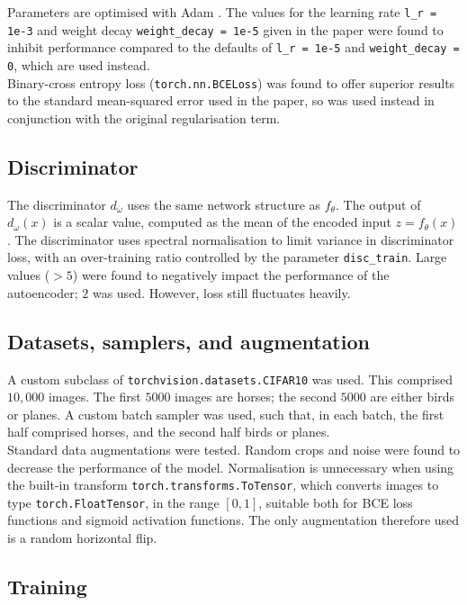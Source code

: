 \documentclass[11pt]{article} %
\begin{document}
Parameters are optimised with Adam \cite{kingma_welling_2014}. The values for the learning rate \verb|l_r = 1e-3| and weight decay \verb|weight_decay = 1e-5| given in the paper were found to inhibit performance compared to the defaults of \verb|l_r = 1e-5| and \verb|weight_decay = 0|, which are used instead.\\

Binary-cross entropy loss (\verb|torch.nn.BCELoss|) was found to offer superior results to the standard mean-squared error used in the paper, so was used instead in conjunction with the original regularisation term.

\subsection{Discriminator}

The discriminator $d_\omega$ uses the same network structure as $f_\theta$. The output of $d_\omega(x)$ is a scalar value, computed as the mean of the encoded input $z = f_\theta(x)$. The discriminator uses spectral normalisation \cite{miyato_2018} to limit variance in discriminator loss, with an over-training ratio controlled by the parameter \verb|disc_train|. Large values ($ >5$) were found to negatively impact the performance of the autoencoder; $2$ was used. However, loss still fluctuates heavily. 

\subsection{Datasets, samplers, and augmentation}

A custom subclass of \verb|torchvision.datasets.CIFAR10| was used. This comprised $10,000$ images. The first $5000$ images are horses; the second $5000$ are either birds or planes. A custom batch sampler was used, such that, in each batch, the first half comprised horses, and the second half birds or planes.\\

Standard data augmentations were tested.  Random crops and noise were found to decrease the performance of the model. Normalisation is unnecessary when using the built-in transform \verb|torch.transforms.ToTensor|, which converts images to type \verb|torch.FloatTensor|, in the range $[0, 1]$, suitable both for BCE loss functions and sigmoid activation functions. The only augmentation therefore used is a random horizontal flip. 

\subsection{Training}
\end{document}
